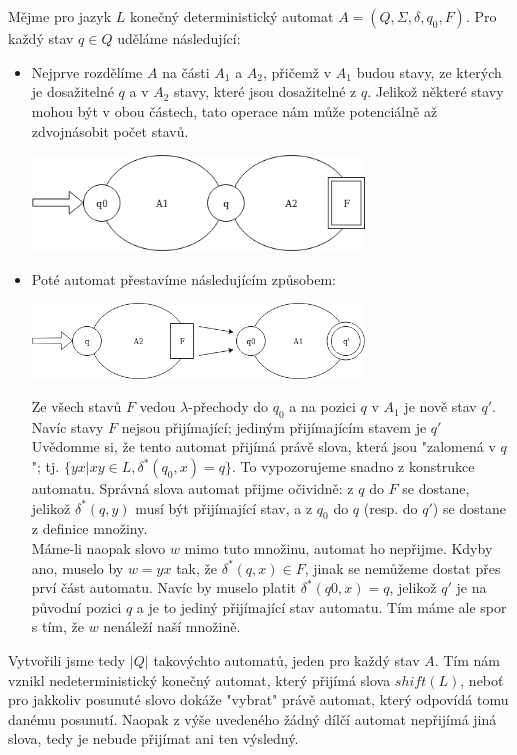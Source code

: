 \documentclass{scrartcl}
\begin{document}
    \section{}
    
    Mějme pro jazyk $L$ konečný deterministický automat $A = (Q, \Sigma, \delta, q_0, F)$. Pro každý stav $q \in Q$ uděláme následující:
    \begin{itemize}
        \item Nejprve rozdělíme $A$ na části $A_1$ a $A_2$, přičemž v $A_1$ budou stavy, ze kterých je dosažitelné $q$ a v $A_2$ stavy, které jsou dosažitelné z $q$. Jelikož některé stavy mohou být v obou částech, tato operace nám může potenciálně až zdvojnásobit počet stavů.
        \begin{center}
            \includegraphics[width=250pt]{automaty_4_1.png}
        \end{center}
        \item Poté automat přestavíme následujícím způsobem:
        \begin{center}
            \includegraphics[width=250pt]{automaty_4_2.png}
        \end{center}
        Ze všech stavů $F$ vedou $\lambda$-přechody do $q_0$ a na pozici $q$ v $A_1$ je nově stav $q'$. Navíc stavy $F$ nejsou přijímající; jediným přijímajícím stavem je $q'$ \\

        Uvědomme si, že tento automat přijímá právě slova, která jsou "zalomená v $q$"; tj. $\{yx | xy \in L, \delta^*(q_0, x) = q\}$. To vypozorujeme snadno z konstrukce automatu. Správná slova automat přijme očividně: z $q$ do $F$ se dostane, jelikož $\delta^*(q, y)$ musí být přijímající stav, a z $q_0$ do $q$ (resp. do $q'$) se dostane z definice množiny. \\

        Máme-li naopak slovo $w$ mimo tuto množinu, automat ho nepřijme. Kdyby ano, muselo by $w = yx$ tak, že $\delta^*(q,x) \in F$, jinak se nemůžeme dostat přes prví část automatu. Navíc by muselo platit $\delta^*(q0, x) = q$, jelikož $q'$ je na původní pozici $q$ a je to jediný přijímající stav automatu. Tím máme ale spor s tím, že $w$ nenáleží naší množině.
    \end{itemize}

    Vytvořili jsme tedy $\vert Q \vert$ takovýchto automatů, jeden pro každý stav $A$. Tím nám vznikl nedeterministický konečný automat, který přijímá slova $shift(L)$, neboť pro jakkoliv posunuté slovo dokáže "vybrat" právě automat, který odpovídá tomu danému posunutí.
    Naopak z výše uvedeného žádný dílčí automat nepřijímá jiná slova, tedy je nebude přijímat ani ten výsledný.
\end{document}
